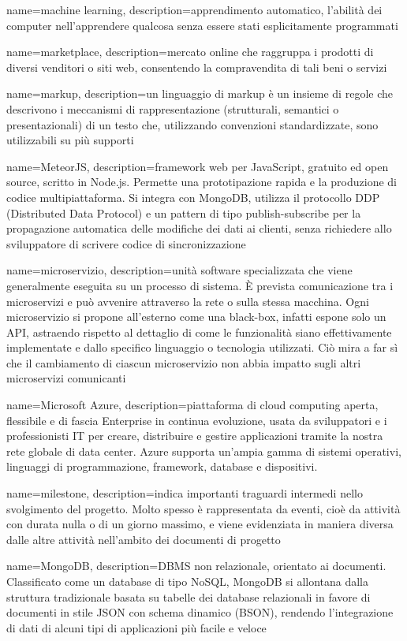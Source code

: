 

{
	name=machine learning,
	description={apprendimento automatico, l'abilità dei computer nell'apprendere qualcosa senza essere stati esplicitamente programmati}
}	

{
	name=marketplace,
	description={mercato online che raggruppa i prodotti di diversi venditori o siti web, consentendo la compravendita di tali beni o servizi}
}

{
	name=markup,
	description={un linguaggio di markup è un insieme di regole che descrivono i meccanismi di rappresentazione (strutturali, semantici o presentazionali) di un testo che, utilizzando convenzioni standardizzate, sono utilizzabili su più supporti}
}

{
	name=MeteorJS,
	description={framework web per JavaScript, gratuito ed open source, scritto in Node.js. Permette una prototipazione rapida e la produzione di codice multipiattaforma. Si integra con MongoDB, utilizza il protocollo DDP (Distributed Data Protocol) e un pattern di tipo publish-subscribe per la propagazione automatica delle modifiche dei dati ai clienti, senza richiedere allo sviluppatore di scrivere codice di sincronizzazione}
}		

{
	name=microservizio,
	description={unità software specializzata che viene generalmente eseguita su un processo di sistema. \MakeUppercase{è} prevista comunicazione tra i microservizi e può avvenire attraverso la rete o sulla stessa macchina. Ogni microservizio si propone all’esterno come una black-box, infatti espone solo un API, astraendo rispetto al dettaglio di come le funzionalità siano effettivamente implementate e dallo specifico linguaggio o tecnologia utilizzati. Ciò mira a far sì che il cambiamento di ciascun microservizio non abbia impatto sugli altri microservizi comunicanti}
}

{
	name=Microsoft Azure,
	description={piattaforma di cloud computing aperta, flessibile e di fascia Enterprise in continua evoluzione, usata da sviluppatori e i professionisti IT per creare, distribuire e gestire applicazioni tramite la nostra rete globale di data center. Azure supporta un'ampia gamma di sistemi operativi, linguaggi di programmazione, framework, database e dispositivi.}
}	

{
	name=milestone,
	description={indica importanti traguardi intermedi nello svolgimento del progetto. Molto spesso è rappresentata da eventi, cioè da attività con durata nulla o di un giorno massimo, e viene evidenziata in maniera diversa dalle altre attività nell'ambito dei documenti di progetto}
}		

{
	name=MongoDB,
	description={DBMS non relazionale, orientato ai documenti. Classificato come un database di tipo NoSQL, MongoDB si allontana dalla struttura tradizionale basata su tabelle dei database relazionali in favore di documenti in stile JSON con schema dinamico (BSON), rendendo l'integrazione di dati di alcuni tipi di applicazioni più facile e veloce}
}	

